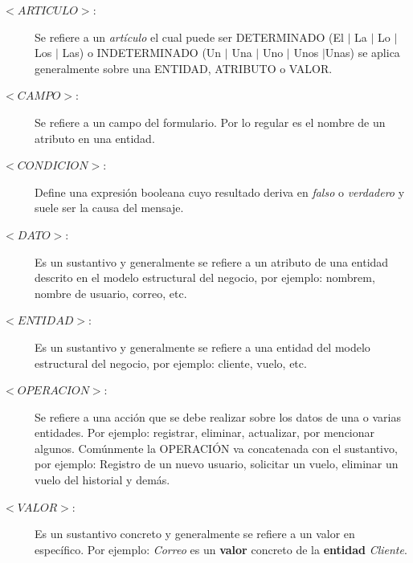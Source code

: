 \begin{description}
	\item [$<ARTICULO>$:] Se refiere a un {\em artículo} el cual puede ser DETERMINADO (El $\mid$ La $\mid$ Lo $\mid$ Los $\mid$ Las) o INDETERMINADO (Un $\mid$ Una $\mid$ 
	Uno $\mid$ Unos $\mid$Unas) se aplica generalmente sobre una ENTIDAD, ATRIBUTO o VALOR.
	
	\item [$<CAMPO>$:] Se refiere a un campo del formulario. Por lo regular es el nombre de un atributo en una entidad.
	
	\item [$<CONDICION>$:] Define una expresión booleana cuyo resultado deriva en {\em falso} o {\em verdadero} y suele ser la causa del mensaje.
	
	\item [$<DATO>$:] Es un sustantivo y generalmente se refiere a un atributo de una entidad descrito en el modelo estructural del negocio, por ejemplo: nombrem, nombre de usuario, correo, etc. %
	
	\item [$<ENTIDAD>$:] Es un sustantivo y generalmente se refiere a una entidad del modelo estructural del negocio, por ejemplo: cliente, vuelo, etc.
	\item [$<OPERACION>$:] Se refiere a una acción que se debe realizar sobre los datos de una o varias entidades. Por ejemplo: registrar, eliminar, actualizar, por mencionar algunos. Comúnmente la OPERACIÓN va concatenada con el sustantivo, por ejemplo: Registro de un nuevo usuario, solicitar un vuelo, eliminar un vuelo del historial y demás.
	
	\item [$<VALOR>$:] Es un sustantivo concreto y generalmente se refiere a un valor en específico. Por ejemplo: \textit{Correo} es un \textbf{valor} concreto de la \textbf{entidad} \textit{Cliente}.
	
\end{description}
